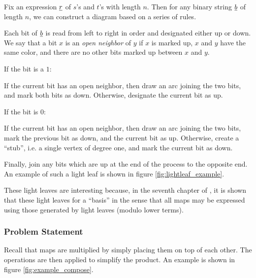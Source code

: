 Fix an expression $\underline{r}$ of $s$'s and $t$'s with length $n$.  Then for any binary string $\underline{b}$ of length $n$, we can construct a diagram based on a series of rules.

Each bit of $\underline{b}$ is read from left to right in order and designated either up or down.  We say that a bit $x$ is an \emph{open neighbor} of $y$ if $x$ is marked up, $x$ and $y$ have the same color, and there are no other bits marked up between $x$ and $y$.
\begin{itemize}
	\ii If the bit is a $1$:
	\begin{itemize}
		\ii If the current bit has an open neighbor, then draw an arc joining the two bits, and mark both bits as down.
		\ii Otherwise, designate the current bit as up.
	\end{itemize}
	\ii If the bit is $0$:
	\begin{itemize}
		\ii If the current bit has an open neighbor, then draw an arc joining the two bits, mark the previous bit as down, and the current bit as up.
		\ii Otherwise, create a ``stub'', i.e. a single vertex of degree one, and mark the current bit as down.
	\end{itemize}
\end{itemize}
Finally, join any bits which are up at the end of the process to the opposite end.  An example of such a light leaf is shown in figure \ref{fig:lightleaf_example}.

These light leaves are interesting because, in the seventh chapter of \cite{span}, it is shown that these light leaves for a ``basis'' in the sense that all maps may be expressed using those generated by light leaves (modulo lower terms).

\subsubsection{Problem Statement}
\label{sec:prelim_probstate}
Recall that maps are multiplied by simply placing them on top of each other.  The operations are then applied to simplify the product.  An example is shown in figure \ref{fig:example_compose}.

